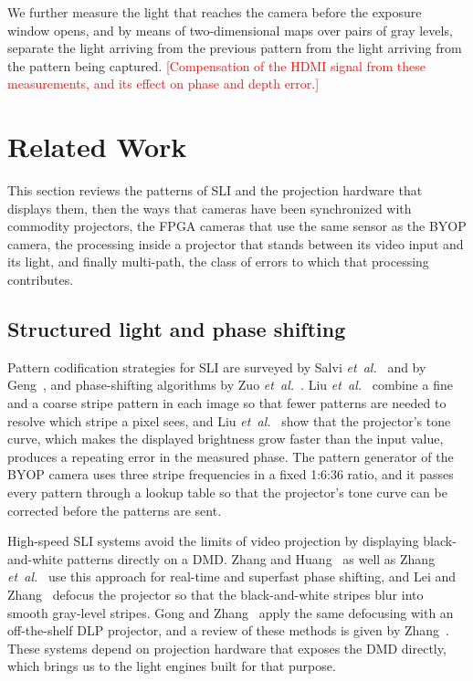 \documentclass[10pt,journal,compsoc]{IEEEtran}
\newcommand{\pending}[1]{\textcolor{red}{[#1]}}
\begin{document}
We
further measure the light that reaches the camera before the exposure window opens, and by means
of two-dimensional maps over pairs of gray levels, separate the light arriving from the previous
pattern from the light arriving from the pattern being captured. \pending{Compensation of
the HDMI signal from these measurements, and its effect on phase and depth error.}


\section{Related Work}
\label{sec:related}

This section reviews the patterns of SLI and the projection hardware that displays them, then the
ways that cameras have been synchronized with commodity projectors, the FPGA cameras that use the
same sensor as the BYOP camera, the processing inside a projector that stands between its video
input and its light, and finally multi-path, the class of errors to which that processing
contributes.

\subsection{Structured light and phase shifting}
Pattern codification strategies for SLI are surveyed by Salvi
\emph{et~al.}~\cite{salvi2004pattern} and by Geng~\cite{geng2011tutorial}, and phase-shifting
algorithms by Zuo \emph{et~al.}~\cite{zuo2018phase}. Liu \emph{et~al.}~\cite{liu2010dualfreq}
combine a fine and a coarse stripe pattern in each image so that fewer patterns are needed to
resolve which stripe a pixel sees, and Liu \emph{et~al.}~\cite{liu2010gamma} show that the
projector's tone curve, which makes the displayed brightness grow faster than the input value,
produces a repeating error in the measured phase. The pattern generator of the BYOP camera uses
three stripe frequencies in a fixed 1:6:36 ratio, and it passes every pattern through a lookup
table so that the projector's tone curve can be corrected before the patterns are sent.

High-speed SLI systems avoid the limits of video projection by displaying black-and-white
patterns directly on a DMD. Zhang and Huang~\cite{zhang2006realtime} as well as Zhang
\emph{et~al.}~\cite{zhang2010superfast} use this approach for real-time and superfast phase
shifting, and Lei and Zhang~\cite{lei2009defocus} defocus the projector so that the
black-and-white stripes blur into smooth gray-level stripes. Gong and
Zhang~\cite{gong2010ultrafast} apply the same defocusing with an off-the-shelf DLP projector, and
a review of these methods is given by Zhang~\cite{zhang2018review}. These systems depend on
projection hardware that exposes the DMD directly, which brings us to the light engines built
for that purpose.
\end{document}
